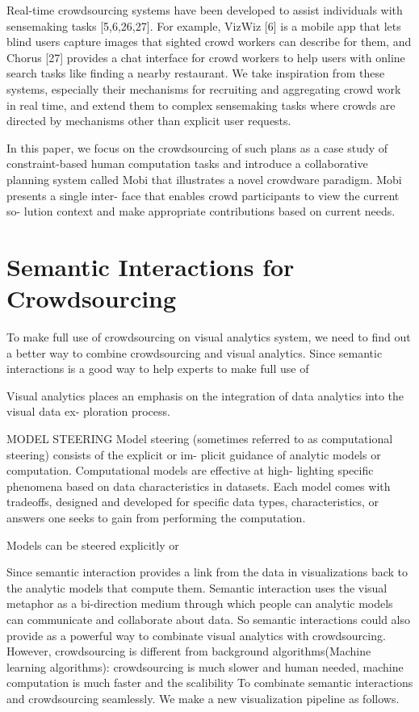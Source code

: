 \documentclass[journal]{vgtc}                %
\begin{document}
Real-time crowdsourcing systems have been developed to assist individuals with sensemaking tasks [5,6,26,27]. For example, VizWiz [6] is a mobile app that lets blind users capture images that sighted crowd workers can describe for them, and Chorus [27] provides a chat interface for crowd workers to help users with online search tasks like finding a nearby restaurant. We take inspiration from these systems, especially their mechanisms for recruiting and aggregating crowd work in real time, and extend them to complex sensemaking tasks where crowds are directed by mechanisms other than explicit user requests.


In this paper, we focus on the crowdsourcing of such plans as a case study of constraint-based human computation tasks and introduce a collaborative planning system called Mobi that illustrates a novel crowdware paradigm. Mobi presents a single inter- face that enables crowd participants to view the current so- lution context and make appropriate contributions based on current needs. 



\section{Semantic Interactions for Crowdsourcing}

To make full use of crowdsourcing on visual analytics system, we need to find out a better way to combine crowdsourcing and visual analytics. 
Since semantic interactions is a good way to help experts to make full use of 

Visual analytics places an emphasis on the integration of data analytics into the visual data ex- ploration process.


MODEL STEERING
Model steering (sometimes referred to as computational steering) consists of the explicit or im- plicit guidance of analytic models or computation. Computational models are eﬀective at high- lighting speciﬁc phenomena based on data characteristics in datasets. Each model comes with tradeoﬀs, designed and developed for speciﬁc data types, characteristics, or answers one seeks to gain from performing the computation.

Models can be steered explicitly or 


Since semantic interaction provides a link from the data in visualizations back to the analytic models that compute them. 
Semantic interaction uses the visual metaphor as a bi-direction medium through which people can analytic models can communicate and collaborate about data.
So semantic interactions could also provide as a powerful way to combinate visual analytics with crowdsourcing. 
However, crowdsourcing is different from background algorithms(Machine learning algorithms): crowdsourcing is much slower and human needed, machine computation is much faster and the scalibility
To combinate semantic interactions and crowdsourcing seamlessly. We make a new visualization pipeline as follows.
\end{document}
